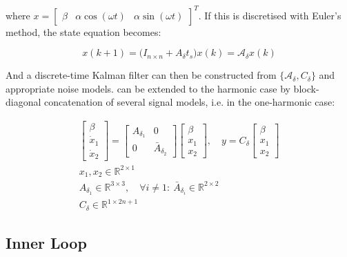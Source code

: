 where $x = \begin{bmatrix}\beta & \alpha \cos(\omega t) & \alpha \sin(\omega t)\end{bmatrix}^T$. If this is discretised with Euler's method, the state equation becomes:

\begin{equation}\label{eq:TheisticDisturbanceEstimatorDiscrete}
	x(k+1) = \Big(I_{n\times n} + A_\delta t_s \Big) x(k) = \mathcal{A}_\delta x(k)
\end{equation}

And a discrete-time Kalman filter can then be constructed from $\{\mathcal{A}_\delta,C_\delta\}$ and appropriate noise models.  can be extended to the harmonic case by block-diagonal concatenation of several signal models, i.e. in the one-harmonic case:

\begin{equation}\label{eq:DisturbanceVectorCase}
	\begin{gathered}
		\begin{bmatrix} \beta \\ \dot{x}_1 \\ \dot{x}_2 \end{bmatrix} = \begin{bmatrix} A_{\delta_1} & 0 \\ 0 & \bar{A}_{\delta_2} \end{bmatrix} \begin{bmatrix}\beta \\ x_1 \\ x_2 \end{bmatrix},
		 \quad y = C_\delta \begin{bmatrix}\beta \\ x_1 \\ x_2 \end{bmatrix} \\
		 x_1, x_2 \in \mathbb{R}^{2\times1} \\
		 A_{\delta_1} \in \mathbb{R}^{3\times3}, \quad \forall i \neq 1: \ \bar{A}_{\delta_i} \in \mathbb{R}^{2\times2} \\
		 C_\delta \in \mathbb{R}^{1\times2n+1}
	\end{gathered}
\end{equation}


\subsection{Inner Loop}\label{subsec:InnerLoop}

